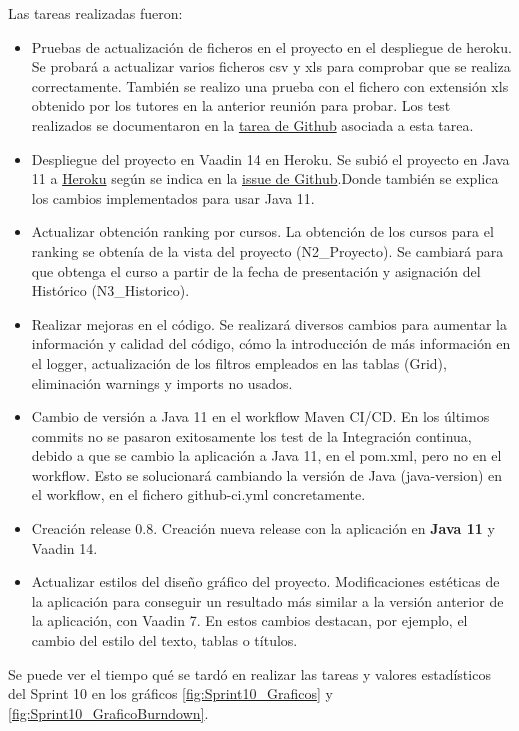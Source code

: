 Las tareas realizadas fueron:
\begin{itemize}
	\tightlist
	\item Pruebas de actualización de ficheros en el proyecto en el despliegue de heroku. 
		Se probará a actualizar varios ficheros csv y xls para comprobar que se realiza correctamente. También se realizo una prueba con el fichero con extensión xls obtenido por los tutores en la anterior reunión para probar. Los test realizados se documentaron en la \href{https://github.com/dbo1001/Gestor-TFG-2021/issues/114}{tarea de Github} asociada a esta tarea.
	\item Despliegue del proyecto en Vaadin 14 en Heroku. 
		Se subió el proyecto en Java 11 a \href{https://gestor-tfg-2021.herokuapp.com/}{Heroku} según se indica en la \href{https://github.com/dbo1001/Gestor-TFG-2021/issues/112}{issue de Github}.Donde también se explica los cambios implementados para usar Java 11.
	\item Actualizar obtención ranking por cursos.
		La obtención de los cursos para el ranking se obtenía de la vista del proyecto (N2\_Proyecto). Se cambiará para que obtenga el curso a partir de la fecha de presentación y asignación del Histórico (N3\_Historico).
	\item Realizar mejoras en el código.
		Se realizará diversos cambios para aumentar la información y calidad del código, cómo la introducción de más información en el logger, actualización de los filtros empleados en las tablas (Grid), eliminación warnings y imports no usados.
	\item Cambio de versión a Java 11 en el workflow Maven CI/CD.
		En los últimos commits no se pasaron exitosamente los test de la Integración continua, debido a que se cambio la aplicación a Java 11, en el pom.xml, pero no en el workflow. Esto se solucionará cambiando la versión de Java (java-version) en el workflow, en el fichero github-ci.yml concretamente.
	\item Creación release 0.8. 
		Creación nueva release con la aplicación en \textbf{Java 11} y Vaadin 14.
	\item Actualizar estilos del diseño gráfico del proyecto.
		Modificaciones estéticas de la aplicación para conseguir un resultado más similar a la versión anterior de la aplicación, con Vaadin 7. En estos cambios destacan, por ejemplo, el cambio del estilo del texto, tablas o títulos.
	
\end{itemize}

Se puede ver el tiempo qué se tardó en realizar las tareas y valores estadísticos del Sprint 10 en los gráficos \ref{fig:Sprint10_Graficos} y \ref{fig:Sprint10_GraficoBurndown}.

